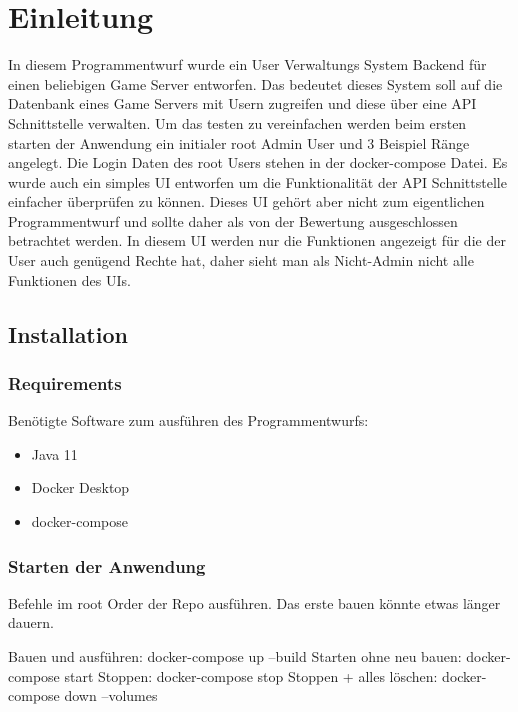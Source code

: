 \chapter{Einleitung}

In diesem Programmentwurf wurde ein User Verwaltungs System Backend für einen beliebigen Game Server entworfen.
Das bedeutet dieses System soll auf die Datenbank eines Game Servers mit Usern zugreifen und diese über eine API Schnittstelle verwalten.
Um das testen zu vereinfachen werden beim ersten starten der Anwendung ein initialer root Admin User und 3 Beispiel Ränge angelegt.
Die Login Daten des root Users stehen in der docker-compose Datei.
Es wurde auch ein simples UI entworfen um die Funktionalität der API Schnittstelle einfacher überprüfen zu können.
Dieses UI gehört aber nicht zum eigentlichen Programmentwurf und sollte daher als von der Bewertung ausgeschlossen betrachtet werden.
In diesem UI werden nur die Funktionen angezeigt für die der User auch genügend Rechte hat, daher sieht man als Nicht-Admin nicht alle Funktionen des UIs.

\section{Installation}

\subsection{Requirements}

Benötigte Software zum ausführen des Programmentwurfs:

\begin{itemize}
    \item Java 11
    \item Docker Desktop
    \item docker-compose
\end{itemize}

\subsection{Starten der Anwendung}
Befehle im root Order der Repo ausführen.
Das erste bauen könnte etwas länger dauern.

Bauen und ausführen: docker-compose up --build
\newline
Starten ohne neu bauen: docker-compose start
\newline
Stoppen: docker-compose stop
\newline
Stoppen + alles löschen: docker-compose down --volumes
\newline

